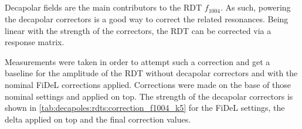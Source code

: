


\subsection{}

Decapolar fields are the main contributors to the RDT $f_{1004}$. As such, powering the decapolar
correctors is a good way to correct the related resonances.
Being linear with the strength of the correctors, the RDT can be corrected via a response matrix.

Measurements were taken in order to attempt such a correction and get a baseline for the amplitude
of the RDT without decapolar correctors and with the nominal FiDeL corrections applied.
Corrections were made on the base of those nominal settings and applied on top. The strength of the
decapolar correctors is shown in \cref{tab:decapoles:rdts:correction_f1004_k5} for the FiDeL
settings, the delta applied on top and the final correction values.


